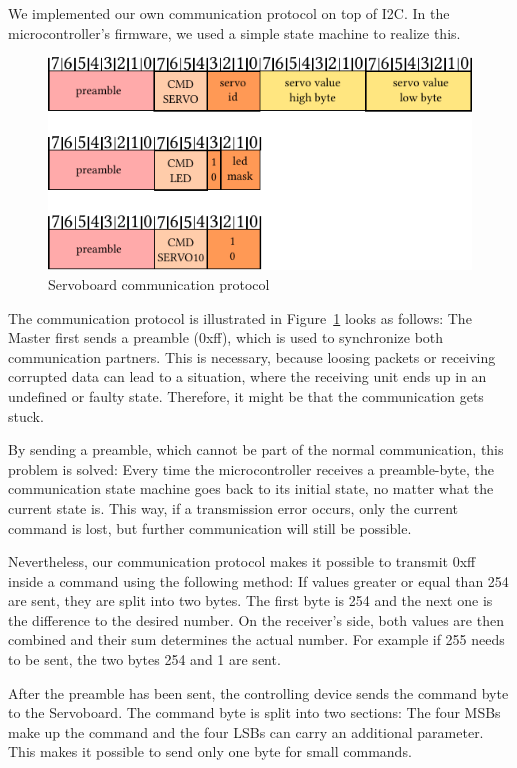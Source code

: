 \documentclass[a4paper
               ,10pt
               ,DIV=10 %
               ,BCOR=0.3cm
               ,pagesize %
               ,headings=small
               ,bibtotoc
               ]
               {scrartcl}
\begin{document}
We implemented our own communication protocol on top of I2C.
In the microcontroller's firmware, we used a simple state machine to realize this.

\begin{figure}[H]
\begin{center}
\includegraphics[width=0.7\linewidth]{pic/servoboardcmds}
\caption{Servoboard communication protocol}
\label{figservoboardcmds}
\end{center}
\end{figure}

The communication protocol is illustrated in Figure~\ref{figservoboardcmds} looks as follows:
The Master first sends a preamble (0xff), which is used to synchronize both communication partners.
This is necessary, because loosing packets or receiving corrupted data can lead to a situation, where the receiving unit ends up in an undefined or faulty state.
Therefore, it might be that the communication gets stuck.

By sending a preamble, which cannot be part of the normal communication, this problem is solved: Every time the microcontroller receives a preamble-byte, the communication state machine goes back to its initial state, no matter what the current state is.
This way, if a transmission error occurs, only the current command is lost, but further communication will still be possible.


Nevertheless, our communication protocol makes it possible to transmit 0xff inside a command using the following method:
If values greater or equal than 254 are sent, they are split into two bytes.
The first byte is 254 and the next one is the difference to the desired number.
On the receiver's side, both values are then combined and their sum determines the actual number. 
For example if 255 needs to be sent, the two bytes 254 and 1 are sent.


After the preamble has been sent, the controlling device sends the command byte to the Servoboard.
The command byte is split into two sections:
The four MSBs make up the command and the four LSBs can carry an additional parameter.
This makes it possible to send only one byte for small commands.
\end{document}
